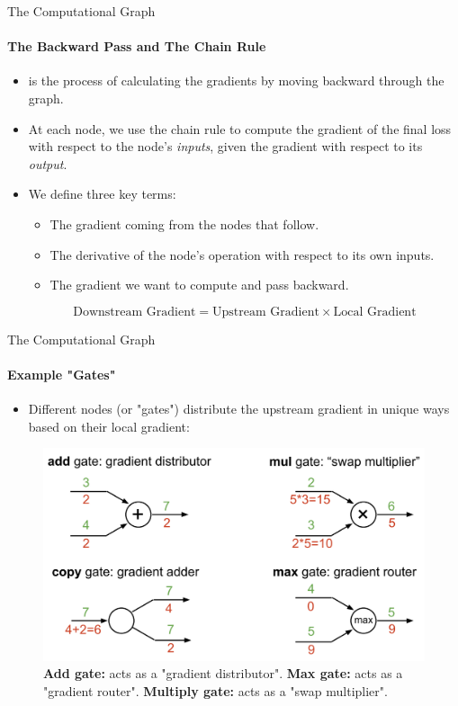 \begin{frame}{The Computational Graph}
    \framesubtitle{The Backward Pass and The Chain Rule}
    \begin{itemize}
        \item {} is the process of calculating the gradients by moving backward through the graph.
        \item At each node, we use the chain rule to compute the gradient of the final loss with respect to the node's \emph{inputs}, given the gradient with respect to its \emph{output}.
        \item We define three key terms:
        \begin{itemize}
            \item {} The gradient coming from the nodes that follow.
            \item {} The derivative of the node's operation with respect to its own inputs.
            \item {} The gradient we want to compute and pass backward.
        \end{itemize}
        \[
            \text{Downstream Gradient} = \text{Upstream Gradient} \times \text{Local Gradient}
        \]
    \end{itemize}
\end{frame}

\begin{frame}{The Computational Graph}
    \framesubtitle{Example "Gates"}
    \begin{itemize}
        \item Different nodes (or "gates") distribute the upstream gradient in unique ways based on their local gradient:
    \end{itemize}
    \begin{figure}
        \centering
        \includegraphics[width=\linewidth]{images/gradient_gates.png}
        \caption{
            \textbf{Add gate:} acts as a "gradient distributor".
            \textbf{Max gate:} acts as a "gradient router".
            \textbf{Multiply gate:} acts as a "swap multiplier".
        }
    \end{figure}
\end{frame}

